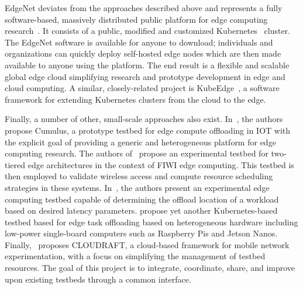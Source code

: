 EdgeNet deviates from the approaches described above and represents a fully software-based, massively distributed public platform for edge computing research~\cite{cappos2018edgenet,senel2021edgenet1,senel2021edgenet2}.
It consists of a public, modified and customized Kubernetes~\cite{kubernetes} cluster.
The EdgeNet software is available for anyone to download;
individuals and organizations can quickly deploy self-hosted edge nodes which are then made available to anyone using the platform.
The end result is a flexible and scalable global edge cloud simplifying research and prototype development in edge and cloud computing.
A similar, closely-related project is KubeEdge~\cite{xiong2018extend}, a software framework for extending Kubernetes clusters from the cloud to the edge.

Finally, a number of other, small-scale approaches also exist.
In~\cite{gedawy2016cumulus}, the authors propose Cumulus, a prototype testbed for edge compute offloading in \gls{IOT} with the explicit goal of providing a generic and heterogeneous platform for edge computing research.
The authors of~\cite{rimal2018experimental} propose an experimental testbed for two-tiered edge architectures in the context of \gls{FIWI} edge computing.
This testbed is then employed to validate wireless access and compute resource scheduling strategies in these systems.
In~\cite{yamanaka2021design}, the authors present an experimental edge computing testbed capable of determining the offload location of a workload based on desired latency parameters.
\cite{diao2019scalable} propose yet another Kubernetes-based testbed based for edge task offloading based on heterogeneous hardware including low-power single-board computers such as Raspberry Pis and Jetson Nanos.
Finally,\ \cite{moorthy2022cloudraft} proposes \gls{CLOUDRAFT}, a cloud-based framework for mobile network experimentation, with a focus on simplifying the management of testbed resources.
The goal of this project is to integrate, coordinate, share, and improve upon existing testbeds through a common interface.


\subsection{}\label{background:xr}


